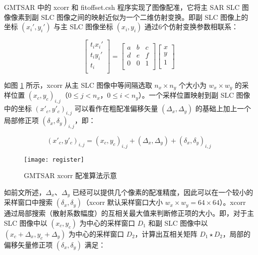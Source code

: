 GMTSAR 中的 xcorr 和 fitoffset.csh 程序实现了图像配准，它将主 SAR SLC 图像像素到副 SLC 图像之间的映射近似为一个二维仿射变换。即副 SLC 图像上的坐标 $(x_i', y_i')$ 与主 SLC 图像坐标 $(x_i, y_i)$ 通过6个仿射变换参数相联系：

\begin{equation}
\begin{bmatrix}
  t_i x_i' \\
  t_i y_i' \\
  t_i \\
\end{bmatrix}
= \begin{bmatrix}
       a & b & c \\
       d & e & f \\
       0 & 0 & 1 \\
\end{bmatrix}
\begin{bmatrix}
  x \\
  y \\
  1 \\
\end{bmatrix}
\end{equation}

如图 \ref{fig:register} 所示，xcorr 从主 SLC 图像中等间隔选取 $n_x \times n_y $ 个大小为 $w_x \times w_y$ 的采样位置 $(x_c, y_c)_{i,j}$（$0 \leq j < n_x$，$0 \leq i < n_y$）。一个采样位置映射到副 SLC 图像中的坐标 $(x'_c, y'_c)_{i,j}$ 可以看作在粗配准偏移矢量 $(\Delta_x, \Delta_y)$ 的基础上加上一个局部修正项 $(\delta_x, \delta_y)_{i,j}$，即：

\begin{equation}
    (x'_c, y'_c)_{i,j} = (x_c, y_c)_{i,j} + (\Delta_x, \Delta_y) + (\delta_x, \delta_y)_{i,j}
\end{equation}

\begin{figure}[htbp]
\centering
\texttt{[image: register]}
\caption{GMTSAR xcorr 配准算法示意} \label{fig:register}
\end{figure}

如前文所述，$\Delta_x$、$\Delta_y$ 已经可以提供几个像素的配准精度，因此可以在一个较小的采样窗口中搜索 $(\delta_x, \delta_y)$（xcorr 默认采样窗口大小 $w_x \times w_y = 64 \times 64$）。xcorr 通过局部搜索（散射系数幅度）的互相关最大值来判断修正项的大小。即，对于主 SLC 图像中以 $(x_c, y_c)$ 为中心的采样窗口 $D_1$ 和副 SLC 图像中以 $(x_c + \Delta_x, y_c + \Delta_y)$ 为中心的采样窗口 $D_2$，计算出互相关矩阵 $D_1 \star D_2$，局部的偏移矢量修正项 $(\delta_x, \delta_y)$ 满足：

